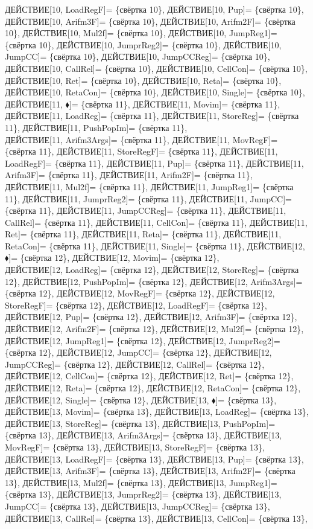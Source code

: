 \documentclass[a0]{a0poster}
\begin{document}
ДЕЙСТВИЕ[10, LoadRegF]= \{свёртка 10\}, ДЕЙСТВИЕ[10, Pup]= \{свёртка 10\}, ДЕЙСТВИЕ[10, Arifm3F]= \{свёртка 10\}, ДЕЙСТВИЕ[10, Arifm2F]= \{свёртка 10\}, ДЕЙСТВИЕ[10, Mul2f]= \{свёртка 10\}, ДЕЙСТВИЕ[10, JumpReg1]= \{свёртка 10\}, ДЕЙСТВИЕ[10, JumprReg2]= \{свёртка 10\}, ДЕЙСТВИЕ[10, JumpCC]= \{свёртка 10\}, ДЕЙСТВИЕ[10, JumpCCReg]= \{свёртка 10\}, ДЕЙСТВИЕ[10, CallRel]= \{свёртка 10\}, ДЕЙСТВИЕ[10, CellCon]= \{свёртка 10\}, ДЕЙСТВИЕ[10, Ret]= \{свёртка 10\}, ДЕЙСТВИЕ[10, Reta]= \{свёртка 10\}, ДЕЙСТВИЕ[10, RetaCon]= \{свёртка 10\}, ДЕЙСТВИЕ[10, Single]= \{свёртка 10\}, ДЕЙСТВИЕ[11, $\blacklozenge$]= \{свёртка 11\}, ДЕЙСТВИЕ[11, Movim]= \{свёртка 11\}, ДЕЙСТВИЕ[11, LoadReg]= \{свёртка 11\}, ДЕЙСТВИЕ[11, StoreReg]= \{свёртка 11\}, ДЕЙСТВИЕ[11, PushPopIm]= \{свёртка 11\}, \\
ДЕЙСТВИЕ[11, Arifm3Args]= \{свёртка 11\}, ДЕЙСТВИЕ[11, MovRegF]= \{свёртка 11\}, ДЕЙСТВИЕ[11, StoreRegF]= \{свёртка 11\}, ДЕЙСТВИЕ[11, LoadRegF]= \{свёртка 11\}, ДЕЙСТВИЕ[11, Pup]= \{свёртка 11\}, ДЕЙСТВИЕ[11, Arifm3F]= \{свёртка 11\}, ДЕЙСТВИЕ[11, Arifm2F]= \{свёртка 11\}, ДЕЙСТВИЕ[11, Mul2f]= \{свёртка 11\}, ДЕЙСТВИЕ[11, JumpReg1]= \{свёртка 11\}, ДЕЙСТВИЕ[11, JumprReg2]= \{свёртка 11\}, ДЕЙСТВИЕ[11, JumpCC]= \{свёртка 11\}, ДЕЙСТВИЕ[11, JumpCCReg]= \{свёртка 11\}, ДЕЙСТВИЕ[11, CallRel]= \{свёртка 11\}, ДЕЙСТВИЕ[11, CellCon]= \{свёртка 11\}, ДЕЙСТВИЕ[11, Ret]= \{свёртка 11\}, ДЕЙСТВИЕ[11, Reta]= \{свёртка 11\}, ДЕЙСТВИЕ[11, RetaCon]= \{свёртка 11\}, ДЕЙСТВИЕ[11, Single]= \{свёртка 11\}, ДЕЙСТВИЕ[12, $\blacklozenge$]= \{свёртка 12\}, ДЕЙСТВИЕ[12, Movim]= \{свёртка 12\}, \\
ДЕЙСТВИЕ[12, LoadReg]= \{свёртка 12\}, ДЕЙСТВИЕ[12, StoreReg]= \{свёртка 12\}, ДЕЙСТВИЕ[12, PushPopIm]= \{свёртка 12\}, ДЕЙСТВИЕ[12, Arifm3Args]= \{свёртка 12\}, ДЕЙСТВИЕ[12, MovRegF]= \{свёртка 12\}, ДЕЙСТВИЕ[12, StoreRegF]= \{свёртка 12\}, ДЕЙСТВИЕ[12, LoadRegF]= \{свёртка 12\}, ДЕЙСТВИЕ[12, Pup]= \{свёртка 12\}, ДЕЙСТВИЕ[12, Arifm3F]= \{свёртка 12\}, ДЕЙСТВИЕ[12, Arifm2F]= \{свёртка 12\}, ДЕЙСТВИЕ[12, Mul2f]= \{свёртка 12\}, ДЕЙСТВИЕ[12, JumpReg1]= \{свёртка 12\}, ДЕЙСТВИЕ[12, JumprReg2]= \{свёртка 12\}, ДЕЙСТВИЕ[12, JumpCC]= \{свёртка 12\}, ДЕЙСТВИЕ[12, JumpCCReg]= \{свёртка 12\}, ДЕЙСТВИЕ[12, CallRel]= \{свёртка 12\}, ДЕЙСТВИЕ[12, CellCon]= \{свёртка 12\}, ДЕЙСТВИЕ[12, Ret]= \{свёртка 12\}, ДЕЙСТВИЕ[12, Reta]= \{свёртка 12\}, ДЕЙСТВИЕ[12, RetaCon]= \{свёртка 12\}, \\
ДЕЙСТВИЕ[12, Single]= \{свёртка 12\}, ДЕЙСТВИЕ[13, $\blacklozenge$]= \{свёртка 13\}, ДЕЙСТВИЕ[13, Movim]= \{свёртка 13\}, ДЕЙСТВИЕ[13, LoadReg]= \{свёртка 13\}, ДЕЙСТВИЕ[13, StoreReg]= \{свёртка 13\}, ДЕЙСТВИЕ[13, PushPopIm]= \{свёртка 13\}, ДЕЙСТВИЕ[13, Arifm3Args]= \{свёртка 13\}, ДЕЙСТВИЕ[13, MovRegF]= \{свёртка 13\}, ДЕЙСТВИЕ[13, StoreRegF]= \{свёртка 13\}, ДЕЙСТВИЕ[13, LoadRegF]= \{свёртка 13\}, ДЕЙСТВИЕ[13, Pup]= \{свёртка 13\}, ДЕЙСТВИЕ[13, Arifm3F]= \{свёртка 13\}, ДЕЙСТВИЕ[13, Arifm2F]= \{свёртка 13\}, ДЕЙСТВИЕ[13, Mul2f]= \{свёртка 13\}, ДЕЙСТВИЕ[13, JumpReg1]= \{свёртка 13\}, ДЕЙСТВИЕ[13, JumprReg2]= \{свёртка 13\}, ДЕЙСТВИЕ[13, JumpCC]= \{свёртка 13\}, ДЕЙСТВИЕ[13, JumpCCReg]= \{свёртка 13\}, ДЕЙСТВИЕ[13, CallRel]= \{свёртка 13\}, ДЕЙСТВИЕ[13, CellCon]= \{свёртка 13\}, \\
\end{document}
